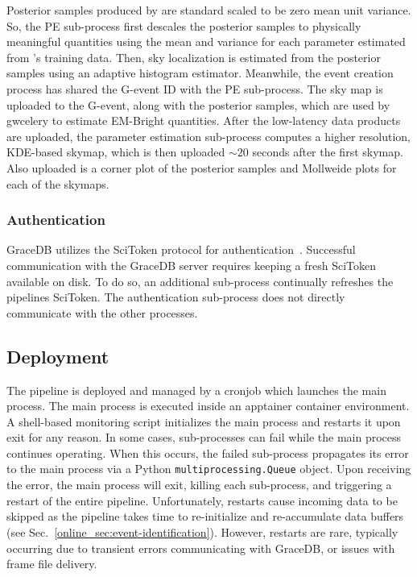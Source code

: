\begin{refsection}
Posterior samples produced by \amplfi are standard scaled to be zero mean unit variance. 
So, the PE sub-process first descales the posterior samples to physically meaningful quantities using the mean and variance for each parameter estimated from \amplfi's training data.
Then, sky localization is estimated from the posterior samples using an adaptive histogram estimator. 
Meanwhile, the event creation process has shared the G-event ID with the PE sub-process. 
The sky map is uploaded to the G-event, along with the posterior samples, which are used by gwcelery to estimate EM-Bright quantities. 
After the low-latency data products are uploaded, the parameter estimation sub-process computes a higher resolution, KDE-based skymap, which is then uploaded $\sim20$ seconds after the first skymap.
Also uploaded is a corner plot of the posterior samples and Mollweide plots for each of the skymaps.

\subsubsection{Authentication}
GraceDB utilizes the SciToken protocol for authentication~\cite{DBLP:journals/corr/abs-1905-09816}. 
Successful communication with the GraceDB server requires keeping a fresh SciToken available on disk. 
To do so, an additional sub-process continually refreshes the pipelines SciToken. 
The authentication sub-process does not directly communicate with the other processes.

\subsection{Deployment}
The pipeline is deployed and managed by a cronjob which launches the main process. 
The main process is executed inside an apptainer container environment. 
A shell-based monitoring script initializes the main process and restarts it upon exit for any reason. 
In some cases, sub-processes can fail  while the main process continues operating. 
When this occurs, the failed sub-process propagates its error to the main process via a Python \texttt{multiprocessing.Queue} object. 
Upon receiving the error, the main process will  exit, killing each sub-process, and triggering a restart of the entire pipeline. 
Unfortunately, restarts cause incoming data to be skipped as the pipeline takes time to re-initialize and re-accumulate data buffers (see Sec.~\ref{online_sec:event-identification}). 
However, restarts are rare, typically occurring due to transient errors communicating with GraceDB, or issues with frame file delivery.


\end{refsection}
